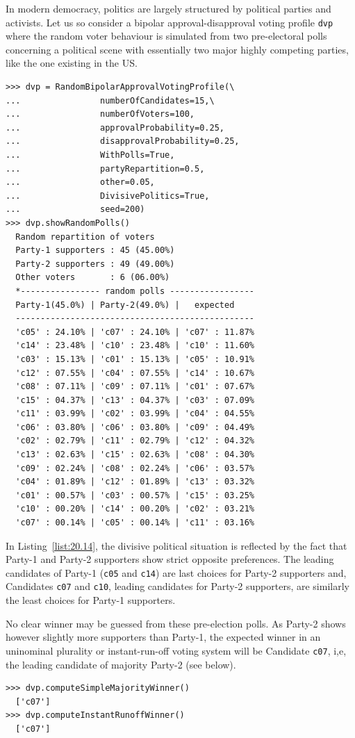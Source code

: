 In modern democracy, politics  are largely structured by political parties and activists. Let us so consider a bipolar approval-disapproval voting profile \texttt{dvp} where the random voter behaviour is simulated from two pre-electoral polls concerning a political scene with essentially two major highly competing parties, like the one existing in the US.
\begin{lstlisting}[caption={A random bipolar approval-disapproval voting profile in a divisive political context},label=list:20.14]
>>> dvp = RandomBipolarApprovalVotingProfile(\
...                numberOfCandidates=15,\
...                numberOfVoters=100,
...                approvalProbability=0.25,
...                disapprovalProbability=0.25,
...                WithPolls=True,
...                partyRepartition=0.5,
...                other=0.05,
...                DivisivePolitics=True,
...                seed=200)
>>> dvp.showRandomPolls()
  Random repartition of voters
  Party-1 supporters : 45 (45.00%)
  Party-2 supporters : 49 (49.00%)
  Other voters       : 6 (06.00%)
  *---------------- random polls -----------------
  Party-1(45.0%) | Party-2(49.0%) |   expected  
  ------------------------------------------------
  'c05' : 24.10% | 'c07' : 24.10% | 'c07' : 11.87%
  'c14' : 23.48% | 'c10' : 23.48% | 'c10' : 11.60%
  'c03' : 15.13% | 'c01' : 15.13% | 'c05' : 10.91%
  'c12' : 07.55% | 'c04' : 07.55% | 'c14' : 10.67%
  'c08' : 07.11% | 'c09' : 07.11% | 'c01' : 07.67%
  'c15' : 04.37% | 'c13' : 04.37% | 'c03' : 07.09%
  'c11' : 03.99% | 'c02' : 03.99% | 'c04' : 04.55%
  'c06' : 03.80% | 'c06' : 03.80% | 'c09' : 04.49%
  'c02' : 02.79% | 'c11' : 02.79% | 'c12' : 04.32%
  'c13' : 02.63% | 'c15' : 02.63% | 'c08' : 04.30%
  'c09' : 02.24% | 'c08' : 02.24% | 'c06' : 03.57%
  'c04' : 01.89% | 'c12' : 01.89% | 'c13' : 03.32%
  'c01' : 00.57% | 'c03' : 00.57% | 'c15' : 03.25%
  'c10' : 00.20% | 'c14' : 00.20% | 'c02' : 03.21%
  'c07' : 00.14% | 'c05' : 00.14% | 'c11' : 03.16%
\end{lstlisting}   

In Listing~\vref{list:20.14}, the divisive political situation is reflected by the fact that Party-1 and Party-2 supporters show strict opposite preferences. The leading candidates of Party-1 (\texttt{c05} and \texttt{c14}) are last choices for Party-2 supporters and, Candidates \texttt{c07} and \texttt{c10}, leading candidates for Party-2 supporters, are similarly the least choices for Party-1 supporters.

No clear winner may be guessed from these pre-election polls. As Party-2 shows however slightly more supporters than Party-1, the expected winner in an uninominal plurality or instant-run-off voting system will be Candidate \texttt{c07}, i,e, the leading candidate of majority Party-2 (see below).
\begin{lstlisting}
>>> dvp.computeSimpleMajorityWinner()
  ['c07']
>>> dvp.computeInstantRunoffWinner()
  ['c07']
\end{lstlisting}


